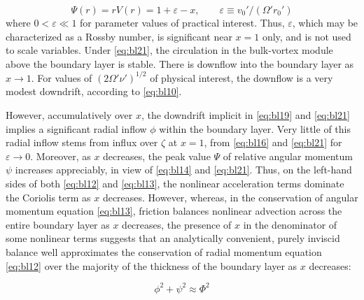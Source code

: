 \documentclass[preprint, prX]{revtex4}
\begin{document}
\begin{equation}
\Psi(r) = rV(r) = 1 + \varepsilon -x, \qquad \varepsilon \equiv v_0'/(\Omega' r_0')
\label{eq:bl21}
\end{equation}
where $0 < \varepsilon \ll 1$ for parameter values of practical interest. Thus, $\varepsilon$, which may be characterized as a Rossby number, is significant near $x = 1$ only, and is not used to scale variables. Under \eqref{eq:bl21}, the circulation in the bulk-vortex module above the boundary layer is stable. There is downflow into the boundary layer as $x \rightarrow 1$. For values of $(2\Omega' \nu')^{1/2}$ of physical interest, the downflow is a very modest downdrift, according to \eqref{eq:bl10}.

However, accumulatively over $x$, the downdrift implicit in \eqref{eq:bl19} and \eqref{eq:bl21} implies a significant radial inflow $\phi$ within the boundary layer. Very little of this radial inflow stems from influx over $\zeta$ at $x = 1$, from \eqref{eq:bl16} and \eqref{eq:bl21} for $\varepsilon \rightarrow 0$. Moreover, as $x$ decreases, the peak value $\Psi$ of relative angular momentum $\psi$ increases appreciably, in view of \eqref{eq:bl14} and \eqref{eq:bl21}. Thus, on the left-hand sides of both \eqref{eq:bl12} and \eqref{eq:bl13}, the nonlinear acceleration terms dominate the Coriolis term as $x$ decreases. However, whereas, in the conservation of angular momentum equation \eqref{eq:bl13}, friction balances nonlinear advection across the entire boundary layer as $x$ decreases, the presence of $x$ in the denominator of some nonlinear terms suggests that an analytically convenient, purely inviscid balance well approximates the conservation of radial momentum equation \eqref{eq:bl12} over the majority of the thickness of the boundary layer as $x$ decreases:

\begin{equation}
\phi^2 + \psi^2 \approx \Phi^2
\label{eq:blinvapprox}
\end{equation}
\end{document}
